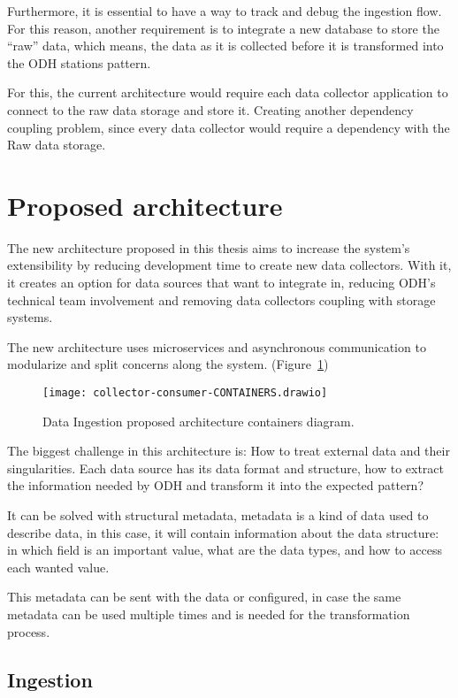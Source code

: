 Furthermore, it is essential to have a way to track and debug the ingestion flow. For this reason, another requirement is to integrate a new database to store the “raw” data, which means, the data as it is collected before it is transformed into the ODH stations pattern.

For this, the current architecture would require each data collector application to connect to the raw data storage and store it. Creating another dependency coupling problem, since every data collector would require a dependency with the Raw data storage.

\section{Proposed architecture}
\label{sec:proposed}

The new architecture proposed in this thesis aims to increase the system's extensibility by reducing development time to create new data collectors. With it, it creates an option for data sources that want to integrate in, reducing ODH's technical team involvement and removing data collectors coupling with storage systems.

The new architecture uses microservices and asynchronous communication to modularize and split concerns along the system. (Figure~\ref{fig:containers})

\begin{figure}
    \centering
    \texttt{[image: collector-consumer-CONTAINERS.drawio]}
    \caption{Data Ingestion proposed architecture containers diagram.\label{fig:containers}}
\end{figure}

The biggest challenge in this architecture is: How to treat external data and their singularities. Each data source has its data format and structure, how to extract the information needed by ODH and transform it into the expected pattern?

It can be solved with structural metadata, metadata is a kind of data used to describe data, in this case, it will contain information about the data structure: in which field is an important value, what are the data types, and how to access each wanted value.

This metadata can be sent with the data or configured, in case the same metadata can be used multiple times and is needed for the transformation process.

\subsection{Ingestion}
\label{sec:ingestion}

